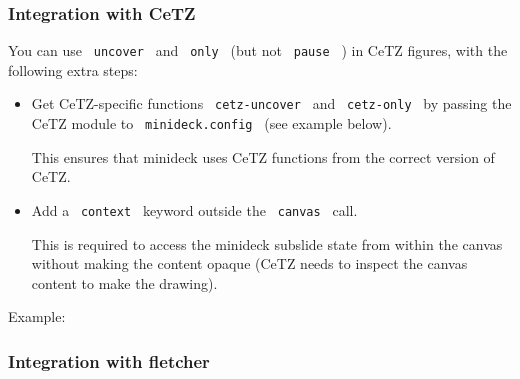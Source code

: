 \subsubsection{Integration with CeTZ}\label{integration-with-cetz}

You can use \texttt{\ uncover\ } and \texttt{\ only\ } (but not
\texttt{\ pause\ } ) in CeTZ figures, with the following extra steps:

\begin{itemize}
\item
  Get CeTZ-specific functions \texttt{\ cetz-uncover\ } and
  \texttt{\ cetz-only\ } by passing the CeTZ module to
  \texttt{\ minideck.config\ } (see example below).

  This ensures that minideck uses CeTZ functions from the correct
  version of CeTZ.
\item
  Add a \texttt{\ context\ } keyword outside the \texttt{\ canvas\ }
  call.

  This is required to access the minideck subslide state from within the
  canvas without making the content opaque (CeTZ needs to inspect the
  canvas content to make the drawing).
\end{itemize}

Example:

\begin{Shaded}
\begin{Highlighting}[]


\NormalTok{\#slide[}

\NormalTok{    content((8,0), box(stroke: red+3pt, inset: 1em)[}
\NormalTok{    ])}
\NormalTok{  \})}
\NormalTok{]}
\end{Highlighting}
\end{Shaded}

\subsubsection{Integration with
fletcher}\label{integration-with-fletcher}

